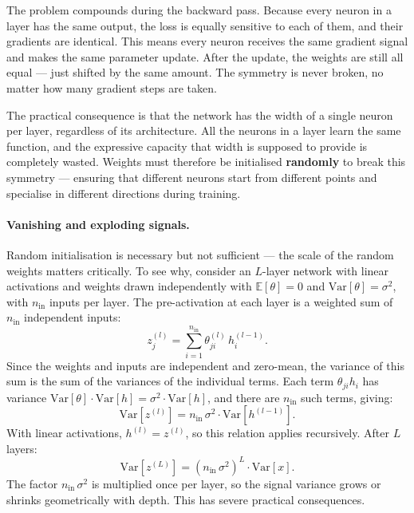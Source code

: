 The problem compounds during the backward pass. Because every neuron in a layer has the same output, the loss is equally sensitive to each of them, and their gradients are identical. This means every neuron receives the same gradient signal and makes the same parameter update. After the update, the weights are still all equal — just shifted by the same amount. The symmetry is never broken, no matter how many gradient steps are taken.

The practical consequence is that the network has the width of a single neuron per layer, regardless of its architecture. All the neurons in a layer learn the same function, and the expressive capacity that width is supposed to provide is completely wasted. Weights must therefore be initialised \textbf{randomly} to break this symmetry — ensuring that different neurons start from different points and specialise in different directions during training.

\paragraph{Vanishing and exploding signals.}
Random initialisation is necessary but not sufficient — the scale of the random weights matters critically. To see why, consider an $L$-layer network with linear activations and weights drawn independently with $\mathbb{E}[\theta] = 0$ and $\mathrm{Var}[\theta] = \sigma^2$, with $n_{\text{in}}$ inputs per layer. The pre-activation at each layer is a weighted sum of $n_{\text{in}}$ independent inputs:
\begin{equation}
    z_j^{(l)} = \sum_{i=1}^{n_{\text{in}}} \theta_{ji}^{(l)}\, h_i^{(l-1)}.
\end{equation}
Since the weights and inputs are independent and zero-mean, the variance of this sum is the sum of the variances of the individual terms. Each term $\theta_{ji} h_i$ has variance $\mathrm{Var}[\theta]\cdot\mathrm{Var}[h] = \sigma^2\cdot\mathrm{Var}[h]$, and there are $n_{\text{in}}$ such terms, giving:
\begin{equation}
    \mathrm{Var}[z^{(l)}] = n_{\text{in}}\,\sigma^2 \cdot \mathrm{Var}[h^{(l-1)}].
\end{equation}
With linear activations, $h^{(l)} = z^{(l)}$, so this relation applies recursively. After $L$ layers:
\begin{equation}
    \mathrm{Var}[z^{(L)}] = (n_{\text{in}}\,\sigma^2)^L \cdot \mathrm{Var}[x].
    \label{eq:variance_propagation}
\end{equation}
The factor $n_{\text{in}}\,\sigma^2$ is multiplied once per layer, so the signal variance grows or shrinks geometrically with depth. This has severe practical consequences.

